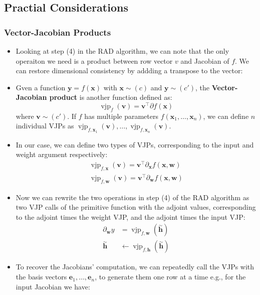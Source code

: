 \documentclass{article}
\newcommand{\tbf}[1]{\textbf{#1}}
\newcommand{\mbf}[1]{\mathbf{#1}}
\begin{document}
    \subsection{Practial Considerations}
    \subsubsection{Vector-Jacobian Products}
    \begin{itemize}
        \item Looking at step (4) in the RAD algorithm, we can note that the only operaiton we need is a product between row vector $v$ and Jacobian of $f$. We can restore dimensional consistency by addding a transpose to the vector:
        \item Gven a function $\mbf{y} = f(\mbf{x})$ with $\mbf{x} \sim (c)$ and $\mbf{y} \sim (c')$, the \tbf{Vector-Jacobian product} is another function defined as:
        \[\operatorname{vjp}_f(\mbf{v}) = \mbf{v}^\top \partial f(\mbf{x})\]
        where $\mbf{v} \sim (c')$. If $f$ has multiple parameters $f(\mbf{x}_1, \hdots, \mbf{x}_n)$, we can define $n$ individual VJPs as $\operatorname{vjp}_{f, \mbf{x}_1}(\mbf{v}), \hdots, \operatorname{vjp}_{f, \mbf{x}_n}(\mbf{v})$.
    \item In our case, we can define two types of VJPs, corresponding to the input and weight argument respectively:
    \begin{align*}
        \operatorname{vjp}_{f,\mbf{x}}(\mbf{v}) = \mbf{v}^\top \partial_\mbf{x} f(\mbf{x}, \mbf{w}) \\
        \operatorname{vjp}_{f,\mbf{w}}(\mbf{v}) = \mbf{v}^\top \partial_\mbf{w} f(\mbf{x}, \mbf{w}) 
    \end{align*}
    \item Now we can rewrite the two operations in step (4) of the RAD algorithm as two VJP calls of the primitive function with the adjoint values, corresponding to the adjoint times the weight VJP, and the adjoint times the input VJP:
    \begin{align*}
        \partial_\mbf{w}y &= \operatorname{vjp}_{f,\mbf{w}}(\overset{\sim}{\mbf{h}}) \\
        \overset{\sim}{\mbf{h}} &\leftarrow \operatorname{vjp}_{f,\mbf{h}}(\overset{\sim}{\mbf{h}})
    \end{align*}
    \item To recover the Jacobians' computation, we can repeatedly call the VJPs with the basis vectors $\mbf{e}_1, \hdots, \mbf{e}_n$, to generate them one row at a time e.g., for the input Jacobian we have:

\end{itemize}
\end{document}
